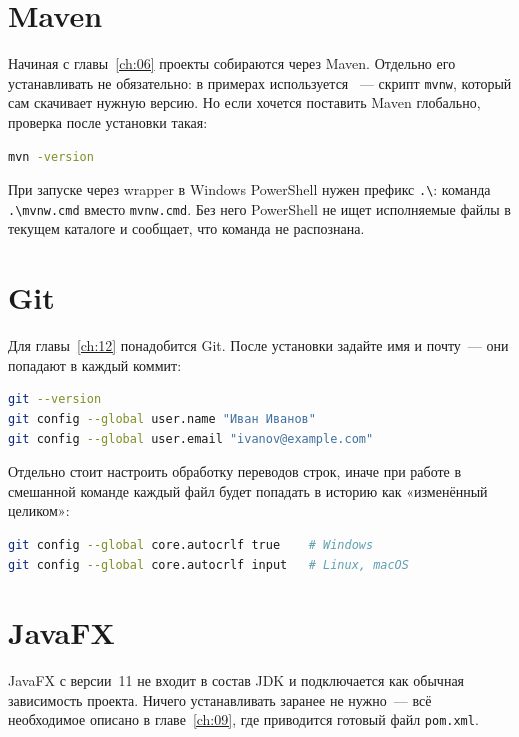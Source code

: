 \section{Maven}

Начиная с главы~\ref{ch:06} проекты собираются через Maven. Отдельно его
устанавливать не обязательно: в примерах используется ~---
скрипт \texttt{mvnw}, который сам скачивает нужную версию. Но если хочется
поставить Maven глобально, проверка после установки такая:

\begin{lstlisting}[language=bash,caption={Проверка Maven},label={lst:app-mvn}]
mvn -version
\end{lstlisting}

При запуске через wrapper в Windows PowerShell нужен префикс \texttt{.\textbackslash}:
команда \texttt{.\textbackslash mvnw.cmd} вместо \texttt{mvnw.cmd}. Без него
PowerShell не ищет исполняемые файлы в текущем каталоге и сообщает, что команда
не распознана.

\section{Git}

Для главы~\ref{ch:12} понадобится Git. После установки задайте имя и почту~---
они попадают в каждый коммит:

\begin{lstlisting}[language=bash,caption={Первичная настройка Git},label={lst:app-git}]
git --version
git config --global user.name "Иван Иванов"
git config --global user.email "ivanov@example.com"
\end{lstlisting}

Отдельно стоит настроить обработку переводов строк, иначе при работе в смешанной
команде каждый файл будет попадать в историю как «изменённый целиком»:

\begin{lstlisting}[language=bash,caption={Настройка переводов строк},label={lst:app-crlf}]
git config --global core.autocrlf true    # Windows
git config --global core.autocrlf input   # Linux, macOS
\end{lstlisting}

\section{JavaFX}

JavaFX с версии~11 не входит в состав JDK и подключается как обычная зависимость
проекта. Ничего устанавливать заранее не нужно~--- всё необходимое описано
в главе~\ref{ch:09}, где приводится готовый файл \texttt{pom.xml}.
